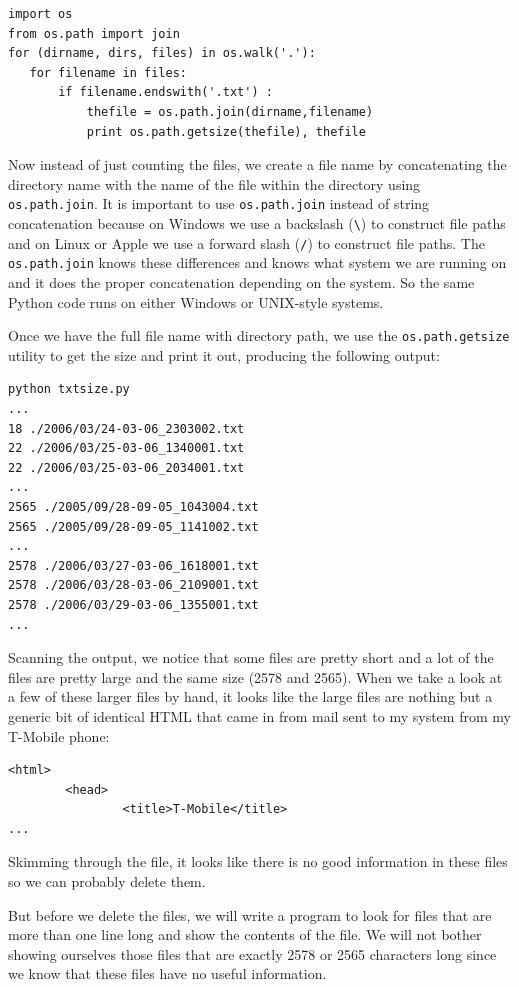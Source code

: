 \documentclass[11pt]{book}
\begin{document}
\beforeverb
\begin{verbatim}
import os
from os.path import join
for (dirname, dirs, files) in os.walk('.'):
   for filename in files:
       if filename.endswith('.txt') :
           thefile = os.path.join(dirname,filename)
           print os.path.getsize(thefile), thefile
\end{verbatim}
\afterverb
%
Now instead of just counting the files, we create 
a file name by concatenating the directory name with
the name of the file within the directory using
{\tt os.path.join}.   It is important to use 
{\tt os.path.join} instead of string concatenation 
because on Windows we use a backslash
(\verb"\") to construct file paths and on Linux
or Apple we use a forward slash (\verb"/") 
to construct file paths.  The {\tt os.path.join}
knows these differences and knows what system
we are running on and it does the proper concatenation
depending on the system.  So the same Python code
runs on either Windows or UNIX-style systems.

Once we have the full file name with directory
path, we use the {\tt os.path.getsize} utility
to get the size and print it out, producing the 
following output:

\beforeverb
\begin{verbatim}
python txtsize.py
...
18 ./2006/03/24-03-06_2303002.txt
22 ./2006/03/25-03-06_1340001.txt
22 ./2006/03/25-03-06_2034001.txt
...
2565 ./2005/09/28-09-05_1043004.txt
2565 ./2005/09/28-09-05_1141002.txt
...
2578 ./2006/03/27-03-06_1618001.txt
2578 ./2006/03/28-03-06_2109001.txt
2578 ./2006/03/29-03-06_1355001.txt
...
\end{verbatim}
\afterverb
%
Scanning the output, we notice that some files are pretty short and 
a lot of the files are pretty large and the same size (2578 and 2565). 
When we take a look at a few of these larger files by hand, 
it looks like the large 
files are nothing but a generic bit of identical HTML that came 
in from mail sent to my system from my T-Mobile phone:

\beforeverb
\begin{verbatim}
<html>
        <head>
                <title>T-Mobile</title>
...
\end{verbatim}
\afterverb
%
Skimming through the file, it looks like there is no good information
in these files so we can probably delete them.

But before we delete the files, we will write a program to look for files
that are more than one line long and show the contents of the file.
We will not bother showing ourselves those files that are exactly
2578 or 2565 characters long since we know that these files have no useful
information.
\end{document}
